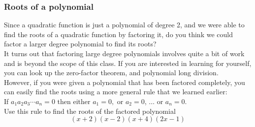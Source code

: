 \documentclass[12pt,fleqn]{book}
\begin{document}
\subsubsection*{Roots of a polynomial}
Since a quadratic function is just a polynomial of degree 2, and we were able to find the roots of a quadratic function by factoring it, do you think we could factor a larger degree polynomial to find its roots?
\\[1em]
It turns out that factoring large degree polynomials involves quite a bit of work and is beyond the scope of this class.  If you are interested in learning for yourself, you can look up the zero-factor theorem, and polynomial long division.
\\[1em]
However, if you were given a polynomial that has been factored completely, you can easily find the roots using a more general rule that we learned earlier:
\\[1em]
If $a_1a_2a_3\cdots a_n=0$ then either $a_1=0,$ or $a_2=0$, $\ldots$ or $a_n=0$.
\\[1em]
Use this rule to find the roots of the factored polynomial
\[
	(x+2)(x-2)(x+4)(2x-1)
\]
\vspace{4em}
\end{document}
